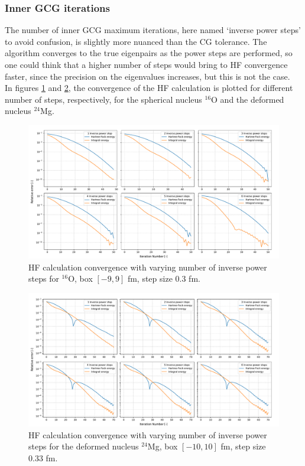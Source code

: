 \subsubsection{Inner GCG iterations}
The number of inner GCG maximum iterations, here named `inverse power steps' to avoid confusion, is slightly more nuanced than the CG tolerance. The algorithm converges to the true eigenpairs as the power steps are performed, so one could think that a higher number of steps would bring to HF convergence faster, since the precision on the eigenvalues increases, but this is not the case.
\\In figures \ref{fig:conv_steps_o} and \ref{fig:conv_steps_mg}, the convergence of the HF calculation is plotted for different number of steps, respectively, for the spherical nucleus $^{16}$O and the deformed nucleus $^{24}$Mg. 
\begin{figure}[H]
    \centering
    \includegraphics[width=1.0\textwidth]{Images/conv_steps_o.pdf}
    \caption{HF calculation convergence with varying number of inverse power steps for $^{16}$O, box $[-9, 9]$ fm, step size $0.3$ fm.}
    \label{fig:conv_steps_o}
\end{figure}
\begin{figure}[H]
    \centering
    \includegraphics[width=1.0\textwidth]{Images/conv_steps.pdf}
    \caption{HF calculation convergence with varying number of inverse power steps for the deformed nucleus $^{24}$Mg, box $[-10, 10]$ fm, step size $0.33$ fm.}
    \label{fig:conv_steps_mg}
\end{figure}
